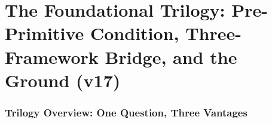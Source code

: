 \documentclass[12pt, a4paper]{article}
\begin{document}
\part{The Foundational Trilogy: Pre-Primitive Condition,
Three-Framework Bridge, and the Ground (v17)}
%
%
%
%


\section{Trilogy Overview: One Question, Three Vantages}

\end{document}
